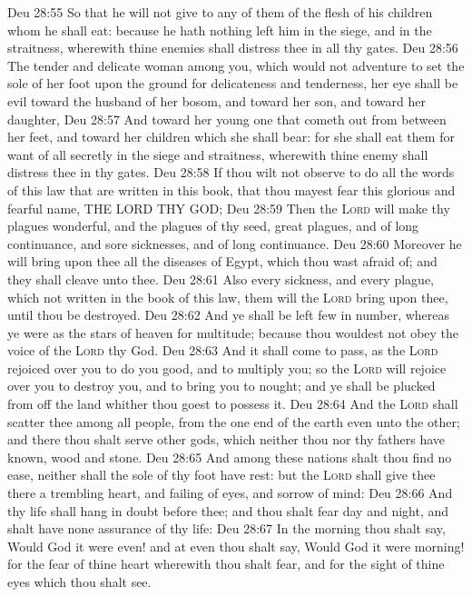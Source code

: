 \vs Deu 28:55 So that he will not give to any of them of the flesh of his children whom he shall eat: because he hath nothing left him in the siege, and in the straitness, wherewith thine enemies shall distress thee in all thy gates.
\vs Deu 28:56 The tender and delicate woman among you, which would not adventure to set the sole of her foot upon the ground for delicateness and tenderness, her eye shall be evil toward the husband of her bosom, and toward her son, and toward her daughter,
\vs Deu 28:57 And toward her young one that cometh out from between her feet, and toward her children which she shall bear: for she shall eat them for want of all  secretly in the siege and straitness, wherewith thine enemy shall distress thee in thy gates.
\vs Deu 28:58 If thou wilt not observe to do all the words of this law that are written in this book, that thou mayest fear this glorious and fearful name, THE LORD THY GOD;
\vs Deu 28:59 Then the \textsc{Lord} will make thy plagues wonderful, and the plagues of thy seed,  great plagues, and of long continuance, and sore sicknesses, and of long continuance.
\vs Deu 28:60 Moreover he will bring upon thee all the diseases of Egypt, which thou wast afraid of; and they shall cleave unto thee.
\vs Deu 28:61 Also every sickness, and every plague, which  not written in the book of this law, them will the \textsc{Lord} bring upon thee, until thou be destroyed.
\vs Deu 28:62 And ye shall be left few in number, whereas ye were as the stars of heaven for multitude; because thou wouldest not obey the voice of the \textsc{Lord} thy God.
\vs Deu 28:63 And it shall come to pass,  as the \textsc{Lord} rejoiced over you to do you good, and to multiply you; so the \textsc{Lord} will rejoice over you to destroy you, and to bring you to nought; and ye shall be plucked from off the land whither thou goest to possess it.
\vs Deu 28:64 And the \textsc{Lord} shall scatter thee among all people, from the one end of the earth even unto the other; and there thou shalt serve other gods, which neither thou nor thy fathers have known,  wood and stone.
\vs Deu 28:65 And among these nations shalt thou find no ease, neither shall the sole of thy foot have rest: but the \textsc{Lord} shall give thee there a trembling heart, and failing of eyes, and sorrow of mind:
\vs Deu 28:66 And thy life shall hang in doubt before thee; and thou shalt fear day and night, and shalt have none assurance of thy life:
\vs Deu 28:67 In the morning thou shalt say, Would God it were even! and at even thou shalt say, Would God it were morning! for the fear of thine heart wherewith thou shalt fear, and for the sight of thine eyes which thou shalt see.
